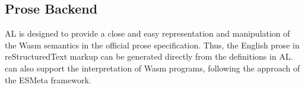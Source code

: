 \subsection{Prose Backend}\label{sec:prose} %
AL is designed to provide a close and easy representation and manipulation of
the Wasm semantics in the official prose specification.
Thus, the English prose in reStructuredText markup can be generated directly from the definitions in AL.
\dslname can also support the interpretation of Wasm programs,
following the approach of the ESMeta framework.
